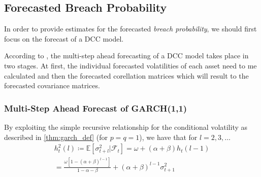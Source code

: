 \documentclass[a4paper, oneside]{discothesis}
\begin{document}
\subsection{Forecasted Breach Probability
}

In order to provide estimates for the forecasted \textit{breach probability}, we should first focus on the forecast of a DCC model.

According to \cite{DCC_Forecast}, the multi-step ahead forecasting of a DCC model takes place in two stages. At first, the individual forecasted volatilities of each asset need to me calculated and then the forecasted corellation matrices which will result to the forecasted covariance matrices. 

\subsubsection{Multi-Step Ahead Forecast of GARCH(1,1)}\label{garchFor}
By exploiting the simple recursive relationship for the conditional volatility as described in \ref{thm:garch_def} (for $p=q=1$), we have that for $l=2,3, \dots$
\begin{equation}
\begin{split}
    h_t^2(l)\coloneqq\mathbb{E}[\sigma^2_{t+l}|\mathcal{F}_t]=\omega+(\alpha+\beta)h_t(l-1)\\
    =\frac{\omega[1-(\alpha+\beta)^{l-1}]}{1-\alpha-\beta}+(\alpha+\beta)^{l-1}\sigma^2_{t+1}
\end{split}
\end{equation}
\end{document}

